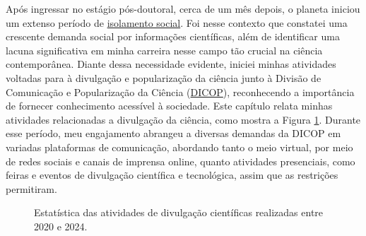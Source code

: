 \documentclass[10pt,a4paper,oneside]{book}
\begin{document}
Após ingressar no estágio pós-doutoral, cerca de um mês depois, o planeta iniciou um extenso período de \href{http://repositoriocovid19.unb.br/repositorio-produtos/desvelando-o-isolamento-social-no-cotidiano-vivido-na-pandemia-da-covid-19/}{isolamento social}. Foi nesse contexto que constatei uma crescente demanda social por informações científicas, além de identificar uma lacuna significativa em minha carreira nesse campo tão crucial na ciência contemporânea. Diante dessa necessidade evidente, iniciei minhas atividades voltadas para à divulgação e popularização da ciência junto à Divisão de Comunicação e Popularização da Ciência (\href{https://www.gov.br/observatorio/pt-br/assuntos/areas-de-atuacao/divulgacao-e-popularizacao-da-ciencia}{DICOP}), reconhecendo a importância de fornecer conhecimento acessível à sociedade. Este capítulo relata minhas atividades relacionadas a divulgação da ciência, como mostra a Figura \ref{fig_resumo_divulgacao}. Durante esse período, meu engajamento abrangeu a diversas demandas da DICOP em variadas plataformas de comunicação, abordando tanto o meio virtual, por meio de redes sociais e canais de imprensa online, quanto atividades presenciais, como feiras e eventos de divulgação científica e tecnológica, assim que as restrições permitiram.

\begin{figure}
	\centering
	\caption{Estatística das atividades de divulgação científicas realizadas entre 2020 e 2024.}
	\label{fig_resumo_divulgacao}
\end{figure}
\end{document}
